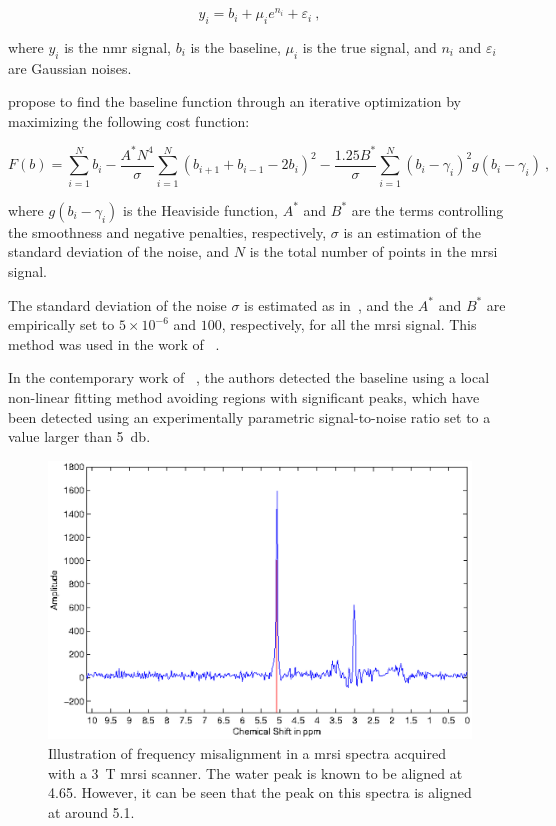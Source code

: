 \begin{enumerate}[leftmargin=*]
\begin{equation}
  y_i = b_i + \mu_i e^{n_i} + \varepsilon_i \ ,
  \label{eq:methodBaselineDetectionModel}
\end{equation}

\noindent where $y_i$ is the \ac{nmr} signal, $b_i$ is the baseline, $\mu_i$ is
the true signal, and $n_i$ and $\varepsilon_i$ are Gaussian noises.

\citeauthor{xi2008baseline} propose to find the baseline function through an
iterative optimization by maximizing the following cost function:

\begin{equation}
  F(b) = \sum_{i = 1}^{N} b_i - \frac{A^{*} N^4}{\sigma} \sum_{i = 1}^{N} (b_{i+1} + b_{i-1} - 2 b_i)^2 - \frac{1.25 B^{*}}{\sigma} \sum_{i = 1}^{N} (b_i - \gamma_i)^2 g(b_i - \gamma_i) \ ,
  \label{eq:methodBaselineDetectionCostFunction}
\end{equation}

\noindent where $g(b_i - \gamma_i)$ is the Heaviside function, $A^*$ and $B^*$
are the terms controlling the smoothness and negative penalties, respectively,
$\sigma$ is an estimation of the standard deviation of the noise, and $N$ is
the total number of points in the \ac{mrsi} signal.

The standard deviation of the noise $\sigma$ is estimated as
in~\cite{xi2008baseline}, and the $A^{*}$ and $B^{*}$ are empirically set to $5
\times 10^{-6}$ and $100$, respectively, for all the \ac{mrsi} signal.
This method was used in the work of
\citeauthor{Lemaitre2016thesis}~\cite{Lemaitre2016thesis}.

In the contemporary work of \citeauthor{Tiwari2012}~\cite{Tiwari2012}, the
authors detected the baseline using a local non-linear fitting method avoiding
regions with significant peaks, which have been detected using an
experimentally parametric signal-to-noise ratio set to a value larger than
\SI{5}{\decibel}.

\begin{figure}
  \centering
  \includegraphics[width=0.7\linewidth]{3_review/figures/processing/pre-processing/frequency/frequency.eps}
  \caption[Illustration of frequency misalignment in a \acs*{mrsi}
  spectra.]{Illustration of frequency misalignment in a \acs*{mrsi} spectra
    acquired with a \SI{3}{\tesla} \acs*{mrsi} scanner. The water peak is known
    to be aligned at \SI{4.65}{\ppm}. However, it can be seen that the peak on
    this spectra is aligned at around \SI{5.1}{\ppm}.}
  \label{fig:frequency}
\end{figure}


\end{enumerate}
